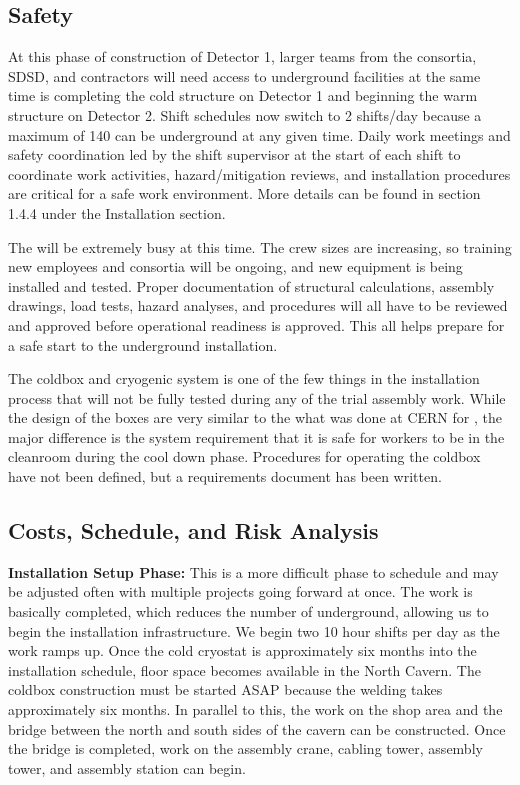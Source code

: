 \subsection{Safety}
\label{sec:fdsp-tc-infr-safety}
At this phase of construction of Detector 1, larger teams from the consortia, SDSD,  and contractors will need access to underground facilities at the same time  is completing the cold structure on Detector 1 and beginning the warm structure on Detector 2. Shift schedules now switch to 2 shifts/day because a maximum of 140  can be underground at any given time.  Daily work meetings and safety coordination led by the shift supervisor at the start of each shift to coordinate work activities, hazard/mitigation reviews, and installation procedures are critical for a safe work environment. More details can be found in section 1.4.4 under the Installation  section. 

The  will be extremely busy at this time. The crew sizes are increasing, so training new employees and consortia will be ongoing, and new equipment is being installed and tested. Proper documentation of structural calculations, assembly drawings, load tests, hazard analyses, and procedures will all have to be reviewed and approved before operational readiness is approved. This all helps prepare for a safe start to the underground installation. 

The coldbox and cryogenic system is one of the few things in the installation process that will not be fully tested during any of the trial assembly work. While the design of the boxes are very similar to the what was done at CERN for , the major difference is the system requirement that it is safe for workers to be in the cleanroom during the cool down phase. Procedures for operating the coldbox have not been defined, but a requirements document has been written.   

\subsection{Costs, Schedule, and Risk Analysis}
\label{sec:fdsp-tc-infr-cost}


{\bf Installation Setup Phase:} This is a more difficult phase to schedule and may be adjusted often with multiple projects going forward at once. The  work is basically completed, which reduces the number of  underground, allowing us to begin the installation infrastructure. We begin two 10 hour shifts per day as the work ramps up.  Once the cold cryostat is approximately six months into the installation schedule, floor space becomes available in the North Cavern. The coldbox construction must be started ASAP because the welding takes approximately six months. In parallel to this, the work on the shop area and the bridge between the north and south sides of the cavern can be constructed.  Once the bridge is completed, work on the assembly crane,  cabling tower,  assembly tower, and  assembly station can begin. 
    
